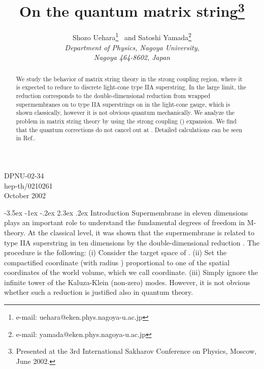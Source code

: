 \documentclass[a4paper,12pt]{article}
\makeatletter
\renewcommand\section{\@startsection {section}{1}{\z@}%
		{-3.5ex \@plus -1ex \@minus -.2ex}%
		{2.3ex \@plus.2ex}%
		{\normalfont\large\bfseries}}
\makeatother
\begin{document}
\title{On the quantum matrix string\footnote{
Presented at the 3rd International Sakharov Conference on Physics,
 Moscow, June 2002.} }

\author{{\sc Shozo Uehara}\footnote{e-mail:
 uehara@eken.phys.nagoya-u.ac.jp}~ and {\sc Satoshi
 Yamada}\footnote{e-mail: yamada@eken.phys.nagoya-u.ac.jp}
\vspace{4mm}\\
{\sl Department of Physics, Nagoya University},\\
{\sl Nagoya 464-8602, Japan}}
\date{}

\maketitle
\vspace{-75mm}
\begin{flushright}
DPNU-02-34\\
hep-th/0210261\\
October 2002
\end{flushright}
\vspace{50mm}
%
\begin{abstract}
We study the behavior of matrix string theory in the strong coupling
region, where it is expected to reduce to discrete light-cone type
IIA superstring.
In the large \coordHE{} limit, the reduction corresponds to the
double-dimensional reduction from wrapped supermembranes on \coordHE{} to type IIA superstrings on \coordHE{} in the light-cone
gauge, which is shown classically, however it is not obvious quantum
mechanically.
We analyze the problem in matrix string theory by using the strong
coupling (\coordHE{}) expansion.
We find that the quantum corrections do not cancel out
at \coordHE{}.
Detailed calculations can be seen in Ref.\cite{UY}.
\end{abstract}

\section{Introduction}
Supermembrane in eleven dimensions \cite{HLP,BST} plays an important
role to understand the fundamental degrees of freedom in M-theory.
At the classical level, it was shown that the supermembrane
is related to type IIA superstring in ten dimensions by the
double-dimensional reduction \cite{DHIS}.
The procedure is the following: (i) Consider the target space of
\coordHE{}. (ii) Set the compactified coordinate (with radius
\coordHE{}) proportional to one of the spatial coordinates of the world volume,
which we call \myHighlight{$\rho$}\coordHE{} coordinate. (iii) Simply ignore the infinite
tower of the Kaluza-Klein (non-zero) modes.
However, it is not obvious whether such a reduction is justified
also in quantum theory.
\end{document}
